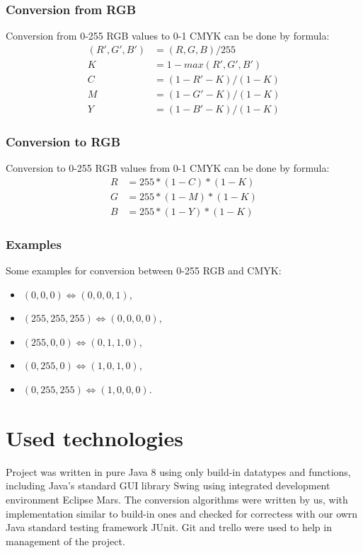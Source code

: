 \documentclass[titlepage]{article}
\begin{document}
\subsubsection{Conversion from RGB}
Conversion from 0-255 RGB values to 0-1 CMYK can be done by formula:
\begin{equation}
\begin{split}
(R', G', B') &= (R, G, B)/255 \\
K&=1-max(R', G', B')\\
C&=(1-R'-K)/(1-K)\\
M&=(1-G'-K)/(1-K)\\
Y&=(1-B'-K)/(1-K)
\end{split}
\end{equation}
\subsubsection{Conversion to RGB}
Conversion to 0-255 RGB values from 0-1 CMYK can be done by formula:
\begin{equation}
\begin{split}
R&=255*(1-C)*(1-K)\\
G&=255*(1-M)*(1-K)\\
B&=255*(1-Y)*(1-K)
\end{split}
\end{equation}

\subsubsection{Examples}
Some examples for conversion between 0-255 RGB and CMYK:
\begin{itemize}
  \item $(0, 0, 0) \Leftrightarrow (0, 0, 0, 1)$,
  \item $(255, 255, 255) \Leftrightarrow (0, 0, 0, 0)$,
  \item $(255, 0, 0) \Leftrightarrow (0, 1, 1, 0)$,
  \item $(0, 255, 0) \Leftrightarrow (1, 0, 1, 0)$,
  \item $(0, 255, 255) \Leftrightarrow (1, 0, 0, 0)$.
\end{itemize}

\section{Used technologies}
Project was written in pure Java 8 using only build-in datatypes and functions, including Java's standard GUI library Swing using integrated development environment Eclipse Mars.
The conversion algorithms were written by us, with implementation similar to build-in ones and checked for correctess with our owrn Java standard testing framework JUnit.
Git and trello were used to help in management of the project.
\end{document}
